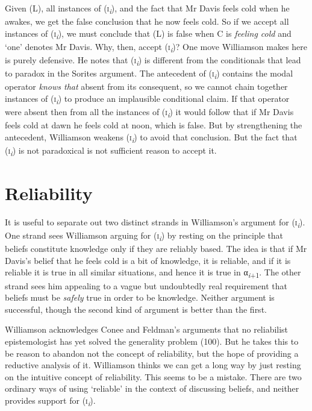 \documentclass[
  10pt,
  letterpaper,
  DIV=11,
  numbers=noendperiod,
  twoside]{scrartcl}
\begin{document}
Given (L), all instances of (\textsc{i}\textsubscript{\emph{i}}), and
the fact that Mr Davis feels cold when he awakes, we get the false
conclusion that he now feels cold. So if we accept all instances of
(\textsc{i}\textsubscript{\emph{i}}), we must conclude that (L) is false
when C is \emph{feeling cold} and `one' denotes Mr Davis. Why, then,
accept (\textsc{i}\textsubscript{\emph{i}})? One move Williamson makes
here is purely defensive. He notes that
(\textsc{i}\textsubscript{\emph{i}}) is different from the conditionals
that lead to paradox in the Sorites argument. The antecedent of
(\textsc{i}\textsubscript{\emph{i}}) contains the modal operator
\emph{knows that} absent from its consequent, so we cannot chain
together instances of (\textsc{i}\textsubscript{\emph{i}}) to produce an
implausible conditional claim. If that operator were absent then from
all the instances of (\textsc{i}\textsubscript{\emph{i}}) it would
follow that if Mr Davis feels cold at dawn he feels cold at noon, which
is false. But by strengthening the antecedent, Williamson weakens
(\textsc{i}\textsubscript{\emph{i}}) to avoid that conclusion. But the
fact that (\textsc{i}\textsubscript{\emph{i}}) is not paradoxical is not
sufficient reason to accept it.

\section{Reliability}\label{reliability}

It is useful to separate out two distinct strands in Williamson's
argument for (\textsc{i}\textsubscript{\emph{i}}). One strand sees
Williamson arguing for (\textsc{i}\textsubscript{\emph{i}}) by resting
on the principle that beliefs constitute knowledge only if they are
reliably based. The idea is that if Mr Davis's belief that he feels cold
is a bit of knowledge, it is reliable, and if it is reliable it is true
in all similar situations, and hence it is true in
α\textsubscript{\emph{i}+1}. The other strand sees him appealing to a
vague but undoubtedly real requirement that beliefs must be
\emph{safely} true in order to be knowledge. Neither argument is
successful, though the second kind of argument is better than the first.

Williamson acknowledges Conee and Feldman's arguments that no
reliabilist epistemologist has yet solved the generality problem (100).
But he takes this to be reason to abandon not the concept of
reliability, but the hope of providing a reductive analysis of it.
Williamson thinks we can get a long way by just resting on the intuitive
concept of reliability. This seems to be a mistake. There are two
ordinary ways of using `reliable' in the context of discussing beliefs,
and neither provides support for (\textsc{i}\textsubscript{\emph{i}}).
\end{document}
